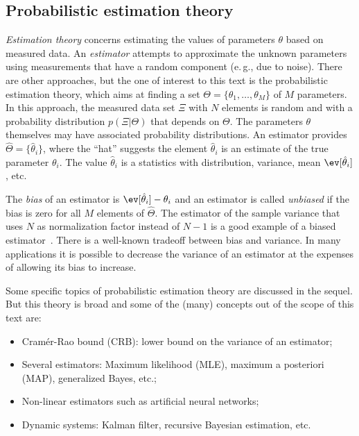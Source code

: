 \subsection{Probabilistic estimation theory}

\emph{Estimation theory} concerns estimating the values of parameters $\theta$ based on measured data.
An \emph{estimator} attempts to approximate the unknown parameters using  measurements that have a random component (e.\,g., due to noise).
There are other approaches, but the one of interest to this text is the
probabilistic estimation theory, which aims at finding a set $\Theta = \{\theta_1,\ldots,\theta_M\}$ of $M$ parameters. In this approach, the measured data set $\Xi$ with $N$ elements is random and with a probability distribution $p(\Xi|\Theta)$ that depends on $\Theta$.
The parameters $\theta$ themselves may have associated probability distributions.
An estimator provides $\hat \Theta = \{\hat \theta_i \}$, where the ``hat'' suggests the element $\hat \theta_i$ is an estimate of the true parameter $\theta_i$.
The value $\hat \theta_i$ is a statistics with distribution, variance, mean $\ev[\hat \theta_i]$, etc. 

The \emph{bias} of an estimator is $\ev[\hat \theta_i] - \theta_i$ and an estimator is called \emph{unbiased} if the bias is zero for all $M$ elements of $\hat \Theta$. 
The estimator of the sample variance that uses $N$ as normalization factor instead of $N-1$ is a good example of a biased estimator~.
 There is a well-known tradeoff between bias and variance. In many applications it is possible
to decrease the variance of an estimator at the expenses of allowing its bias to increase.

Some specific topics of probabilistic estimation theory are discussed in the sequel.
But this theory is broad and some of the (many) concepts out of the scope of this text are:
\begin{itemize}
	\item Cram\'er-Rao bound (CRB): lower bound on the variance of an estimator;
	\item Several estimators: Maximum likelihood (MLE), maximum a posteriori (MAP), generalized Bayes, etc.;
	\item Non-linear estimators such as artificial neural networks;
	\item Dynamic systems: Kalman filter, recursive Bayesian estimation, etc.
\end{itemize}

